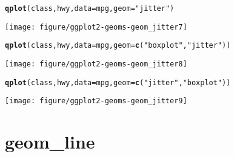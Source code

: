 \documentclass[a4paper,titlepage]{tufte-handout}\usepackage{graphicx, color}
\makeatletter
\def\maxwidth{ %
  \ifdim\Gin@nat@width>\linewidth
    \linewidth
  \else
    \Gin@nat@width
  \fi
}
\newcommand{\hlfunctioncall}[1]{\textcolor[rgb]{0.501960784313725,0,0.329411764705882}{\textbf{#1}}}%
\newcommand{\hlstring}[1]{\textcolor[rgb]{0.6,0.6,1}{#1}}%
\newenvironment{kframe}{%
 \def\at@end@of@kframe{}%
 \ifinner\ifhmode%
  \def\at@end@of@kframe{\end{minipage}}%
  \begin{minipage}{\columnwidth}%
 \fi\fi%
 \def\FrameCommand##1{\hskip\@totalleftmargin \hskip-\fboxsep
 \colorbox{shadecolor}{##1}\hskip-\fboxsep
     \hskip-\linewidth \hskip-\@totalleftmargin \hskip\columnwidth}%
 \MakeFramed {\advance\hsize-\width
   \@totalleftmargin\z@ \linewidth\hsize
   \@setminipage}}%
 {\par\unskip\endMakeFramed%
 \at@end@of@kframe}
\newenvironment{knitrout}{}{} %
\makeatother
\begin{document}
\begin{knitrout}
\begin{kframe}
\begin{alltt}
\hlfunctioncall{qplot}(class, hwy, data = mpg, geom = \hlstring{"jitter"})
\end{alltt}
\end{kframe}\texttt{[image: figure/ggplot2-geoms-geom\_jitter7]} \begin{kframe}\begin{alltt}
\hlfunctioncall{qplot}(class, hwy, data = mpg, geom = \hlfunctioncall{c}(\hlstring{"boxplot"}, \hlstring{"jitter"}))
\end{alltt}
\end{kframe}\texttt{[image: figure/ggplot2-geoms-geom\_jitter8]} \begin{kframe}\begin{alltt}
\hlfunctioncall{qplot}(class, hwy, data = mpg, geom = \hlfunctioncall{c}(\hlstring{"jitter"}, \hlstring{"boxplot"}))
\end{alltt}
\end{kframe}\texttt{[image: figure/ggplot2-geoms-geom\_jitter9]} 
\end{knitrout}


\section{geom\_line}
\end{document}
